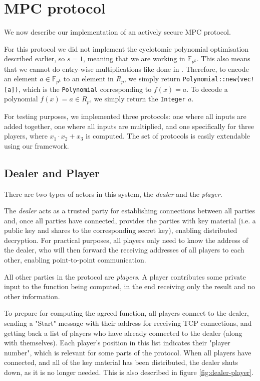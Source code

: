 \documentclass[../main.tex]{subfiles}
\begin{document}
\section{MPC protocol}
We now describe our implementation of an actively secure MPC protocol.

For this protocol we did not implement the cyclotomic polynomial optimisation described earlier, so $s = 1$, meaning that we are working in $\mathbb{F}_{p^k}$.
This also means that we cannot do entry-wise multiplications like done in \cite{damgaard2012multiparty}.
Therefore, to encode an element $a \in \mathbb{F}_{p^k}$ to an element in $R_p$, we simply return \lstinline{Polynomial::new(vec![a])}, which is the \lstinline{Polynomial} corresponding to $f(x) = a$. To decode a polynomial $f(x) = a \in R_p$, we simply return the \lstinline{Integer} $a$.

For testing purposes, we implemented three protocols: one where all inputs are added together, one where all inputs are multiplied, and one specifically for three players, where $x_1 \cdot x_2 + x_3$ is computed. The set of protocols is easily extendable using our framework.

\subsection{Dealer and Player}

There are two types of actors in this system, the \textit{dealer} and the \textit{player}.

The \textit{dealer} acts as a trusted party for establishing connections between all parties and, once all parties have connected, provides the parties with key material (i.e. a public key and shares to the corresponding secret key), enabling distributed decryption.
For practical purposes, all players only need to know the address of the dealer, who will then forward the receiving addresses of all players to each other, enabling point-to-point communication.

All other parties in the protocol are \textit{players}.
A player contributes some private input to the function being computed, in the end receiving only the result and no other information.

To prepare for computing the agreed function, all players connect to the dealer, sending a "Start" message with their address for receiving TCP connections, and getting back a list of players who have already connected to the dealer (along with themselves).
Each player's position in this list indicates their "player number", which is relevant for some parts of the protocol.
When all players have connected, and all of the key material has been distributed, the dealer shuts down, as it is no longer needed.
This is also described in figure \ref{fig:dealer-player}.
\end{document}
